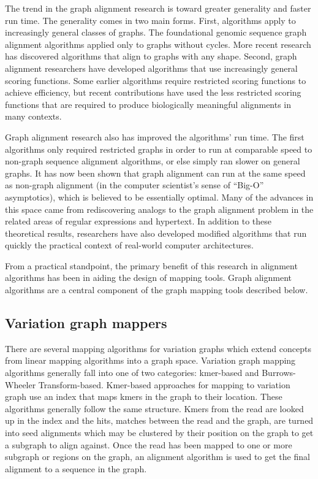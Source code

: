 The trend in the graph alignment research is toward greater generality and faster run time. 
The generality comes in two main forms. 
First, algorithms apply to increasingly general classes of graphs. 
The foundational genomic sequence graph alignment algorithms applied only to graphs without cycles\cite{Lee_2002, Grasso_2004}. 
More recent research has discovered algorithms that align to graphs with any shape\cite{Antipov_2015,Rautiainen_2017,Jain_2019a}. 
Second, graph alignment researchers have developed algorithms that use increasingly general scoring functions. 
Some earlier algorithms require restricted scoring functions to achieve efficiency\cite{Rautiainen_2017}, but recent contributions have used the less restricted scoring functions that are required to produce biologically meaningful alignments in many contexts\cite{Jain_2019a}.

Graph alignment research also has improved the algorithms' run time. 
The first algorithms only required restricted graphs in order to run at comparable speed to non-graph sequence alignment algorithms, or else simply ran slower on general graphs\cite{Lee_2002, Kavya_2019}. 
It has now been shown that graph alignment can run at the same speed as non-graph alignment (in the computer scientist's sense of ``Big-O'' asymptotics), which is believed to be essentially optimal\cite{Jain_2019a,Equi_2019}. 
Many of the advances in this space came from rediscovering analogs to the graph alignment problem in the related areas of regular expressions and hypertext\cite{Myers_1989,Amir_1997}. 
In addition to these theoretical results, researchers have also developed modified algorithms that run quickly the practical context of real-world computer architectures\cite{Suzuki_2018,Rautiainen_2019,Jain_2019b}.

From a practical standpoint, the primary benefit of this research in alignment algorithms has been in aiding the design of mapping tools. 
Graph alignment algorithms are a central component of the graph mapping tools described below.

\subsection{Variation graph mappers}
There are several mapping algorithms for variation graphs which extend concepts from linear mapping algorithms into a graph space.
Variation graph mapping algorithms generally fall into one of two categories: kmer-based and Burrows-Wheeler Transform-based.
Kmer-based approaches for mapping to variation graph use an index that maps kmers in the graph to their location.
These algorithms generally follow the same structure.
Kmers from the read are looked up in the index and the hits, matches between the read and the graph, are turned into seed alignments which may be clustered by their position on the graph to get a subgraph to align against.
Once the read has been mapped to one or more subgraph or regions on the graph, an alignment algorithm is used to get the final alignment to a sequence in the graph.

